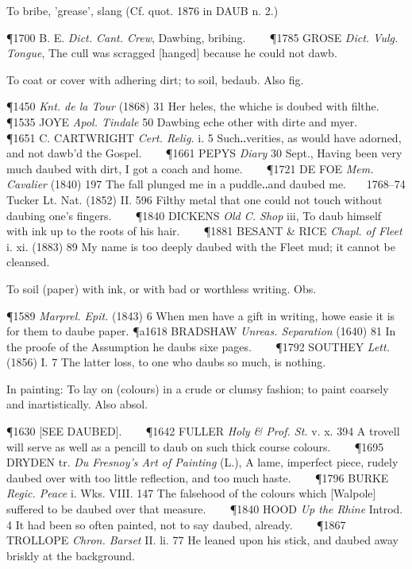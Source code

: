 \begin{description}[wide, labelwidth=!, labelindent=0pt]
\begin{myenumerate}
 To bribe, 'grease', slang (Cf. quot. 1876 in  DAUB n. 2.)

\P 1700 B. E. \textit{Dict.  Cant. Crew}, Dawbing, bribing.    
\P 1785 GROSE  \textit{Dict. Vulg. Tongue}, The cull was scragged [hanged] because he could not dawb.

 To coat or cover with adhering dirt; to soil, bedaub. Also fig.

\P 1450  \textit{Knt. de la Tour} (1868) 31 Her heles, the whiche is doubed with filthe.    
\P 1535 JOYE  \textit{Apol. Tindale} 50 Dawbing eche other with dirte and myer.    
\P 1651 C. CARTWRIGHT  \textit{Cert. Relig.} i. 5 Such‥verities, as would have adorned, and not dawb'd the Gospel.    
\P 1661 PEPYS  \textit{Diary} 30 Sept., Having been very much daubed with dirt, I got a coach and home.    
\P 1721 DE FOE  \textit{Mem. Cavalier} (1840) 197 The fall plunged me in a puddle‥and daubed me.    1768–74 Tucker Lt. Nat. (1852) II. 596 Filthy metal that one could not touch without daubing one's fingers.    
\P 1840 DICKENS  \textit{Old C. Shop} iii, To daub himself with ink up to the roots of his hair.    
\P 1881 BESANT \& RICE  \textit{Chapl. of Fleet} i. xi. (1883) 89 My name is too deeply daubed with the Fleet mud; it cannot be cleansed.

 To soil (paper) with ink, or with bad or worthless writing. Obs.

\P 1589 \textit{Marprel. Epit.} (1843) 6 When men have a gift in writing, howe easie it is for them to daube paper.
\P a1618 BRADSHAW  \textit{Unreas. Separation} (1640) 81 In the proofe of the Assumption he daubs sixe pages.    
\P 1792 SOUTHEY  \textit{Lett.} (1856) I. 7 The latter loss, to one who daubs so much, is nothing.

 In painting: To lay on (colours) in a crude or clumsy fashion; to paint coarsely and inartistically. Also absol.

\P 1630 [SEE DAUBED].    
\P 1642 FULLER  \textit{Holy \& Prof. St.} v. x. 394 A trovell will serve as well as a pencill to daub on such thick course colours.    
\P 1695 DRYDEN tr.  \textit{Du Fresnoy's Art of Painting} (L.), A lame, imperfect piece, rudely daubed over with too little reflection, and too much haste.    
\P 1796 BURKE  \textit{Regic. Peace} i. Wks. VIII. 147 The falsehood of the colours which [Walpole] suffered to be daubed over that measure.    
\P 1840 HOOD  \textit{Up the Rhine} Introd. 4 It had been so often painted, not to say daubed, already.    
\P 1867 TROLLOPE  \textit{Chron. Barset} II. li. 77 He leaned upon his stick, and daubed away briskly at the background.


\end{myenumerate}
\end{description}
